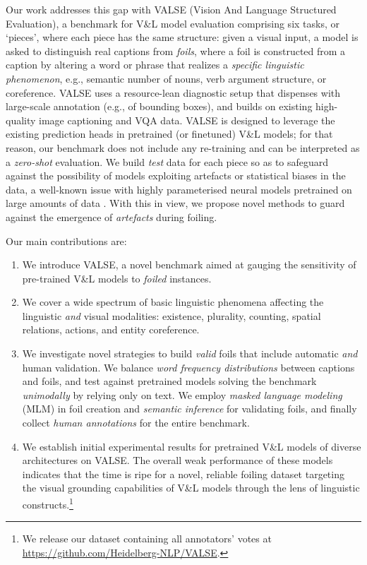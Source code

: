 \documentclass[11pt]{article}
\newcommand{\dataset}{VALSE}
\begin{document}
Our work addresses this gap with \dataset{} (Vision And Language Structured Evaluation), a benchmark for V\&L model evaluation 
comprising six 
tasks, or `pieces', where each piece has the same structure: given a visual input, a 
model is asked to distinguish real captions from \textit{foils},
where a foil is constructed from a caption by altering a word or phrase that realizes
a \emph{specific linguistic phenomenon}, e.g.,
semantic number 
of nouns, verb argument structure, or coreference. 
\dataset{} uses a resource-lean diagnostic setup that  dispenses with large-scale annotation 
(e.g., of bounding boxes), and builds on existing high-quality image captioning and VQA data.
\dataset{} is designed to leverage the existing prediction heads in pretrained (or finetuned) V\&L models; for that reason, our benchmark does not include any re-training and can be interpreted as a \textit{zero-shot} evaluation.
We build \textit{test} data for each piece so as to safeguard against the possibility of models exploiting artefacts or statistical biases in the data, a well-known issue with highly parameterised neural models pretrained on large amounts of data \citep{goyal2017making,madhyastha-etal-2018-defoiling,10.3389/frai.2019.00028}.
With this in view, we propose novel methods to guard against the emergence of \emph{artefacts} during foiling.



Our main contributions are:

\begin{enumerate}[label=\roman*), noitemsep]
    \item We introduce \dataset{}, a novel benchmark aimed at gauging the sensitivity of 
pre-trained V\&L models 
to \emph{foiled} instances.
    \item We cover a wide spectrum of basic linguistic phenomena affecting the linguistic \emph{and} visual modalities: existence, plurality, counting, spatial relations, actions, and entity coreference.   
    \item We investigate novel strategies to build \textit{valid}
foils that include automatic \textit{and} human validation.
We balance 
\textit{word frequency distributions} between captions and foils, and test against 
pretrained models 
solving the benchmark \textit{unimodally} by relying only on text. 
We employ
\textit{masked language modeling} (MLM)
in foil creation and \textit{semantic inference} for validating foils, and 
finally collect \textit{human annotations} for the entire benchmark.
\item We establish initial experimental results for
pretrained V\&L models 
of diverse architectures on \dataset{}.
The overall weak performance of these models
indicates that the time is ripe for a 
novel, reliable foiling dataset targeting
the 
    visual grounding capabilities of V\&L models through the lens of linguistic constructs.\footnote{We release our dataset containing all annotators' votes \cite{prabhakaran2021releasing} at \url{https://github.com/Heidelberg-NLP/VALSE}. }
\end{enumerate}
\end{document}
